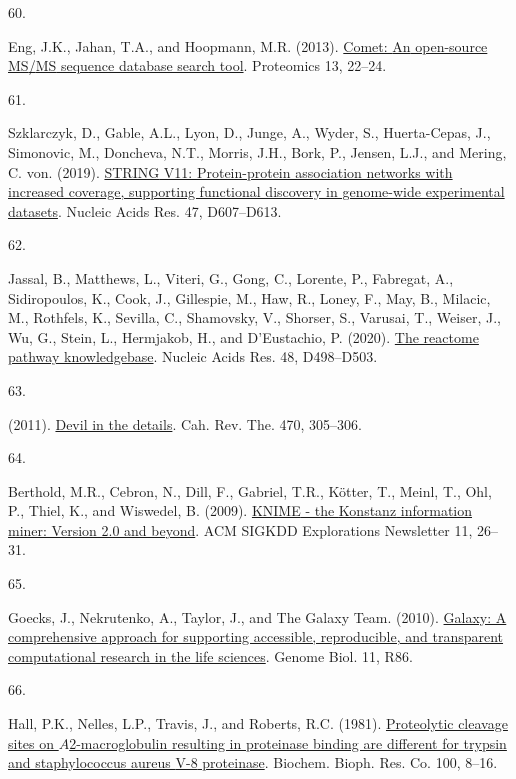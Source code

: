 \documentclass[
]{article}
\newlength{\cslhangindent}
\newlength{\csllabelwidth}
\newlength{\cslentryspacingunit} %
\newenvironment{CSLReferences}[2] %
 {%
  \setlength{\parindent}{0pt}
  \ifodd #1
  \let\oldpar\par
  \def\par{\hangindent=\cslhangindent\oldpar}
  \fi
  \setlength{\parskip}{#2\cslentryspacingunit}
 }%
 {}
\newcommand{\CSLLeftMargin}[1]{\parbox[t]{\csllabelwidth}{#1}}
\newcommand{\CSLRightInline}[1]{\parbox[t]{\linewidth - \csllabelwidth}{#1}\break}
\begin{document}
\begin{CSLReferences}{0}{0}
\leavevmode{}%
\CSLLeftMargin{60. }
\CSLRightInline{Eng, J.K., Jahan, T.A., and Hoopmann, M.R. (2013). \href{https://doi.org/10.1002/pmic.201200439}{Comet: {An} open-source {MS}/{MS} sequence database search tool}. Proteomics 13, 22--24.}

\leavevmode{}%
\CSLLeftMargin{61. }
\CSLRightInline{Szklarczyk, D., Gable, A.L., Lyon, D., Junge, A., Wyder, S., Huerta-Cepas, J., Simonovic, M., Doncheva, N.T., Morris, J.H., Bork, P., Jensen, L.J., and Mering, C. von. (2019). \href{https://doi.org/10.1093/nar/gky1131}{{STRING} V11: Protein-protein association networks with increased coverage, supporting functional discovery in genome-wide experimental datasets}. Nucleic Acids Res. 47, D607--D613.}

\leavevmode{}%
\CSLLeftMargin{62. }
\CSLRightInline{Jassal, B., Matthews, L., Viteri, G., Gong, C., Lorente, P., Fabregat, A., Sidiropoulos, K., Cook, J., Gillespie, M., Haw, R., Loney, F., May, B., Milacic, M., Rothfels, K., Sevilla, C., Shamovsky, V., Shorser, S., Varusai, T., Weiser, J., Wu, G., Stein, L., Hermjakob, H., and D'Eustachio, P. (2020). \href{https://doi.org/10.1093/nar/gkz1031}{The reactome pathway knowledgebase}. Nucleic Acids Res. 48, D498--D503.}

\leavevmode{}%
\CSLLeftMargin{63. }
\CSLRightInline{(2011). \href{https://doi.org/10.1038/470305b}{Devil in the details}. Cah. Rev. The. 470, 305--306.}

\leavevmode{}%
\CSLLeftMargin{64. }
\CSLRightInline{Berthold, M.R., Cebron, N., Dill, F., Gabriel, T.R., Kötter, T., Meinl, T., Ohl, P., Thiel, K., and Wiswedel, B. (2009). \href{https://doi.org/10.1145/1656274.1656280}{{KNIME} - the {Konstanz} information miner: Version 2.0 and beyond}. ACM SIGKDD Explorations Newsletter 11, 26--31.}

\leavevmode{}%
\CSLLeftMargin{65. }
\CSLRightInline{Goecks, J., Nekrutenko, A., Taylor, J., and The Galaxy Team. (2010). \href{https://doi.org/10.1186/gb-2010-11-8-r86}{Galaxy: A comprehensive approach for supporting accessible, reproducible, and transparent computational research in the life sciences}. Genome Biol. 11, R86.}

\leavevmode{}%
\CSLLeftMargin{66. }
\CSLRightInline{Hall, P.K., Nelles, L.P., Travis, J., and Roberts, R.C. (1981). \href{https://doi.org/10.1016/S0006-291X(81)80055-1}{Proteolytic cleavage sites on {\(A\)}2-macroglobulin resulting in proteinase binding are different for trypsin and staphylococcus aureus {V-8} proteinase}. Biochem. Bioph. Res. Co. 100, 8--16.}


\end{CSLReferences}
\end{document}
